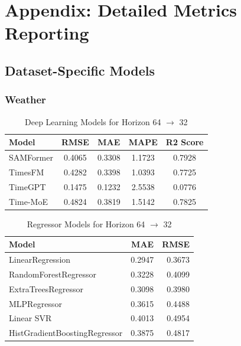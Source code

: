 \chapter{Appendix: Detailed Metrics Reporting}\label{appendixA}


\section{Dataset-Specific Models}

\subsection{Weather}


\begin{table}[h!]
     \centering
     \begin{tabular}{lcccc}
     \hline
     Model & RMSE  & MAE   & MAPE  & R2 Score \\
     \hline
     SAMFormer   & 0.4065 & 0.3308 & 1.1723 & 0.7928 \\
     TimesFM     & 0.4282 & 0.3398 & 1.0393 & 0.7725 \\
     TimeGPT     & 0.1475 & 0.1232 & 2.5538 & 0.0776 \\
     Time-MoE    & 0.4824 & 0.3819 & 1.5142 & 0.7825 \\
     \hline
     \end{tabular}
     \caption{Deep Learning Models for Horizon 64 $\to$ 32}
     \label{tab:weather_64to32_dl}
\end{table}
     

\begin{table}[h!]
     \centering
     \begin{tabular}{lrr}
     \hline
     Model                       & MAE   & RMSE  \\
     \hline
     LinearRegression            & 0.2947 & 0.3673 \\
     RandomForestRegressor       & 0.3228 & 0.4099 \\
     ExtraTreesRegressor         & 0.3098 & 0.3980 \\
     MLPRegressor                & 0.3615 & 0.4488 \\
     Linear SVR                  & 0.4013 & 0.4954 \\
     HistGradientBoostingRegressor & 0.3875 & 0.4817 \\
     \hline
     \end{tabular}
     \caption{Regressor Models for Horizon 64 $\to$ 32}
     \label{tab:weather_64to32_reg}
\end{table}
     


